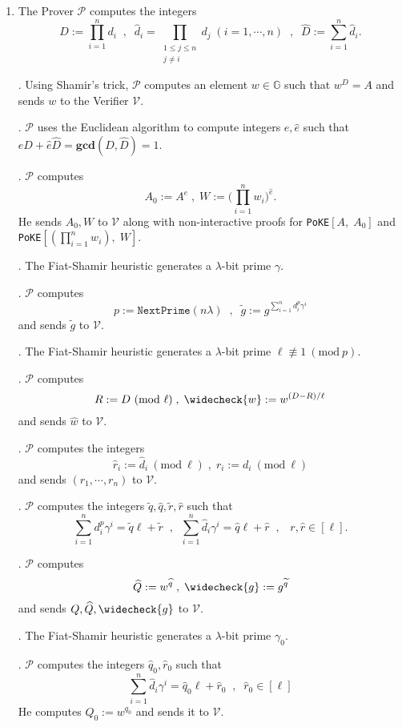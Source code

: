 \documentclass[11pt, lettersize, notitlepage, leqno, footskip=0.6cm]{article}
\newcommand{\pl}{\prod\limits}
\newcommand{\slim}{\sum\limits}
\newcommand{\ttt}{\texttt}
\newcommand{\wti}{\widetilde}
\newcommand{\mc}{\mathcal}
\newcommand{\mb}{\mathbb}
\newcommand{\mbf}{\mathbf}
\newcommand{\lam}{\lambda}
\newcommand{\what}{\widehat}
\newcommand{\weck}{\widecheck}
\newcommand{\mP}{\mc{P}}
\newcommand{\V}{\mc{V}}
\newcommand{\vs}{\vspace{-0.15cm}}
\newcommand{\noin}{\noindent}
\newcommand{\Mod}[1]{\ (\mathrm{mod}\ #1)}
\newcommand{\GCD}{\mbf{gcd}}
\numberwithin{equation}{section}
\begin{document}
\begin{enumerate}[wide, labelwidth=!, labelindent=0pt]\vs \item The Prover $\mc{P}$ computes the integers \vs $$D := \prod\limits_{i=1}^n d_i\;\;,\;\;\what{d}_i = \pl_{\substack{1\leq j\leq n\\ j\neq i}} d_j\;(i=1,\cdots,n)\;\;,\;\; \what{D}:=\slim_{i=1}^n\what{d}_i.$$ \vs

\noin 2. Using Shamir's trick, $\mc{P}$ computes an element $w\in\mb{G}$ such that $w^D = A$ and sends $w$ to the Verifier $\mc{V}$.

\noin 3. $\mP$ uses the Euclidean algorithm to compute integers $e,\what{e}$ such that $eD+\what{e}\what{D} = \GCD(D,\what{D}) = 1.$

\noin 4. $\mP$ computes $$A_0:= A^{e}\;,\;W := \big(\pl_{i=1}^n w_i\big)^{\what{e}}.$$ He sends $A_0,W$ to $\V$ along with non-interactive proofs for \verb|PoKE|$[A,\; A_0]$ and \verb|PoKE|$[(\pl_{i=1}^n w_i),\; W]$.

\noin 5. The Fiat-Shamir heuristic generates a $\lam$-bit prime $\gamma$.

\noin 6. $\mc{P}$ computes \vs $$p:= \ttt{NextPrime}(n\lam)\;\;,\;\;\wti{g} := g^{\slim_{i=1}^n d_i^{p}\gamma^i}$$ and sends $\wti{g}$ to $\mc{V}$.

\noin 7. The Fiat-Shamir heuristic generates a $\lam$-bit prime $\ell\not\equiv 1\Mod{p}$.

\noin 8. $\mc{P}$ computes \vs $$R:= D\Mod{\ell}\;,\; \weck{w}:= w^{(D-R)/\ell}$$ and sends $\what{w}$ to $\mc{V}$.

\noin 9. $\mc{P}$ computes the integers \vs $$\what{r}_i:= \what{d}_i\Mod{\ell}\;,\;{r}_i:= {d}_i\Mod{\ell}$$ and sends $(r_1,\cdots,r_n)$ to $\mc{V}$.

\noin 10. $\mP$ computes the integers $\wti{q},\what{q}, \wti{r}, \what{r}$ such that \vs $$\slim_{i=1}^n {d}_i^{p}\gamma^i = \wti{q}\ell+\wti{r}\;\;,\;\; \slim_{i=1}^n \what{d}_i\gamma^i = \what{q}\ell+\what{r}\;\;,\;\;\;r,\what{r}\in [\ell].$$

\noin 11. $\mP$ computes \vs $$ \what{Q}:= w^{\what{q}}\;,\;\weck{g}:= g^{\wti{q}}$$ and sends $Q, \what{Q}, \weck{g}$ to $\V$.

\noin 12. The Fiat-Shamir heuristic generates a $\lam$-bit prime $\gamma_0$.

\noin 13. $\mP$ computes the integers $\what{q}_0, \what{r}_0$ such that \vs $$\slim_{i=1}^n \what{d}_i\gamma^i = \what{q}_0 \ell+\what{r}_0\;\;,\;\;\what{r}_0\in [\ell]$$ He computes $\what{Q}_0:= w^{\what{q}_0} $ and sends it to $\V$.


\end{enumerate}
\end{document}
